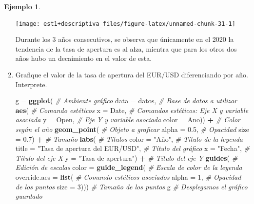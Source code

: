 \documentclass[
  11pt,
]{book}
\newenvironment{Shaded}{\begin{snugshade}}{\end{snugshade}}
\newcommand{\AttributeTok}[1]{\textcolor[rgb]{0.13,0.29,0.53}{#1}}
\newcommand{\CommentTok}[1]{\textcolor[rgb]{0.56,0.35,0.01}{\textit{#1}}}
\newcommand{\DecValTok}[1]{\textcolor[rgb]{0.00,0.00,0.81}{#1}}
\newcommand{\FloatTok}[1]{\textcolor[rgb]{0.00,0.00,0.81}{#1}}
\newcommand{\FunctionTok}[1]{\textcolor[rgb]{0.13,0.29,0.53}{\textbf{#1}}}
\newcommand{\NormalTok}[1]{#1}
\newcommand{\OtherTok}[1]{\textcolor[rgb]{0.56,0.35,0.01}{#1}}
\newcommand{\SpecialCharTok}[1]{\textcolor[rgb]{0.81,0.36,0.00}{\textbf{#1}}}
\newcommand{\StringTok}[1]{\textcolor[rgb]{0.31,0.60,0.02}{#1}}
\theoremstyle{definition}
\theoremstyle{definition}
\newtheorem{example}{Ejemplo}[chapter]
\theoremstyle{definition}
\theoremstyle{definition}
\theoremstyle{remark}
\begin{document}
\begin{example}
\begin{enumerate}
  \begin{center}\texttt{[image: est1+descriptiva\_files/figure-latex/unnamed-chunk-31-1]} \end{center}

  Durante los 3 años consecutivos, se observa que únicamente en el 2020 la tendencia de la tasa de apertura es al alza, mientra que para los otros dos años hubo un decaimiento en el valor de esta.
\item
  Grafique el valor de la tasa de apertura del EUR/USD diferenciando por año. Interprete.

\begin{Shaded}
\begin{Highlighting}[]
\NormalTok{g }\OtherTok{=} \FunctionTok{ggplot}\NormalTok{( }\CommentTok{\# Ambiente gráfico}
  \AttributeTok{data =}\NormalTok{ datos, }\CommentTok{\# Base de datos a utilizar}
  \FunctionTok{aes}\NormalTok{( }\CommentTok{\# Comando estéticos}
\AttributeTok{x =}\NormalTok{ Date, }\CommentTok{\# Comandos estéticos: Eje X y variable asociada}
\AttributeTok{y =}\NormalTok{ Open, }\CommentTok{\# Eje Y y variable asociada}
\AttributeTok{color =}\NormalTok{ Ano)) }\SpecialCharTok{+} \CommentTok{\# Color según el año}
  \FunctionTok{geom\_point}\NormalTok{( }\CommentTok{\# Objeto a graficar}
\AttributeTok{alpha =} \FloatTok{0.5}\NormalTok{, }\CommentTok{\# Opacidad}
\AttributeTok{size =} \FloatTok{0.7}\NormalTok{) }\SpecialCharTok{+} \CommentTok{\# Tamaño}
  \FunctionTok{labs}\NormalTok{( }\CommentTok{\# Títulos}
\AttributeTok{color =} \StringTok{"Año"}\NormalTok{, }\CommentTok{\# Título de la leyenda}
\AttributeTok{title =} \StringTok{"Tasa de apertura del EUR/USD"}\NormalTok{, }\CommentTok{\# Título del gráfico}
\AttributeTok{x =} \StringTok{"Fecha"}\NormalTok{, }\CommentTok{\# Título del eje X}
\AttributeTok{y =} \StringTok{"Tasa de apertura"}\NormalTok{) }\SpecialCharTok{+} \CommentTok{\# Título del eje Y}
  \FunctionTok{guides}\NormalTok{( }\CommentTok{\# Edición de escalas}
\AttributeTok{color =} \FunctionTok{guide\_legend}\NormalTok{( }\CommentTok{\# Escala de color de la leyenda}
  \AttributeTok{override.aes =} \FunctionTok{list}\NormalTok{( }\CommentTok{\# Comando estéticos asociados}
    \AttributeTok{alpha =} \DecValTok{1}\NormalTok{, }\CommentTok{\# Opacidad de los puntos}
    \AttributeTok{size =} \DecValTok{3}\NormalTok{))) }\CommentTok{\# Tamaño de los puntos}
\NormalTok{g }\CommentTok{\# Desplegamos el gráfico guardado}
\end{Highlighting}
\end{Shaded}


\end{enumerate}
\end{example}
\end{document}

